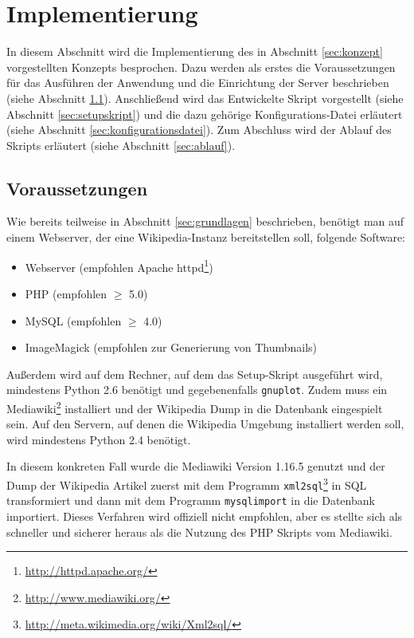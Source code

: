 \section{Implementierung}
\label{sec:implementierung}

In diesem Abschnitt wird die Implementierung des in Abschnitt \ref{sec:konzept} vorgestellten Konzepts besprochen. Dazu werden als erstes die Voraussetzungen für das Ausführen der Anwendung und die Einrichtung der Server beschrieben (siehe Abschnitt \ref{sec:voraussetzungen}). Anschließend wird das Entwickelte Skript vorgestellt (siehe Abschnitt \ref{sec:setupskript}) und die dazu gehörige Konfigurations-Datei erläutert (siehe Abschnitt \ref{sec:konfigurationsdatei}). Zum Abschluss wird der Ablauf des Skripts erläutert (siehe Abschnitt \ref{sec:ablauf}).

\subsection{Voraussetzungen}
\label{sec:voraussetzungen}

Wie bereits teilweise in Abschnitt \ref{sec:grundlagen} beschrieben, benötigt man auf einem Webserver, der eine Wikipedia-Instanz bereitstellen soll, folgende Software:
\begin{itemize}
\item Webserver (empfohlen Apache httpd\footnote{\url{http://httpd.apache.org/}})
\item PHP (empfohlen $\geq$ 5.0)
\item MySQL (empfohlen $\geq$ 4.0)
\item ImageMagick (empfohlen zur Generierung von Thumbnails)
\end{itemize}

Außerdem wird auf dem Rechner, auf dem das Setup-Skript ausgeführt wird, mindestens Python 2.6 benötigt und gegebenenfalls \texttt{gnuplot}. Zudem muss ein Mediawiki\footnote{\url{http://www.mediawiki.org/}} installiert und der Wikipedia Dump in die Datenbank eingespielt sein. Auf den Servern, auf denen die Wikipedia Umgebung installiert werden soll, wird mindestens Python 2.4 benötigt.

In diesem konkreten Fall wurde die Mediawiki Version 1.16.5 genutzt und der Dump der Wikipedia Artikel zuerst mit dem Programm \texttt{xml2sql}\footnote{\url{http://meta.wikimedia.org/wiki/Xml2sql/}} in SQL transformiert und dann mit dem Programm \texttt{mysqlimport} in die Datenbank importiert. Dieses Verfahren wird offiziell nicht empfohlen, aber es stellte sich als schneller und sicherer heraus als die Nutzung des PHP Skripts vom Mediawiki.

